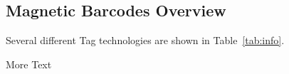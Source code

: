 \subsection{Magnetic Barcodes Overview}
\label{sec:FlywheelAndBraking}

Several different Tag technologies are shown in Table~\ref{tab:info}.

More Text





